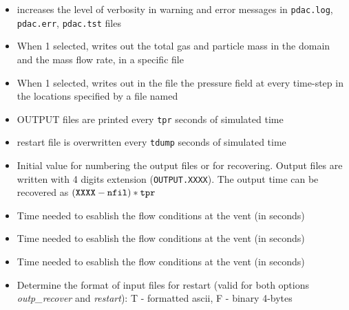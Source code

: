 \begin{itemize}
\item
{}
{increases the level of verbosity in warning and error messages 
in {\tt pdac.log}, {\tt pdac.err}, {\tt pdac.tst} files}

\item
{}
{ When 1 selected, writes out the total gas and particle mass in the domain
and the mass flow rate, in a specific file }

\item
{}
{ When 1 selected, writes out in the file  the pressure field at every time-step
in the locations specified by a file named }

\item
{}
{OUTPUT files are printed every {\tt tpr} seconds of simulated time}

\item
{}
{restart file is overwritten every {\tt tdump} seconds of simulated time}

\item
{}
{Initial value for numbering the output files or for recovering.
Output files are written with 4 digits extension ({\tt OUTPUT.XXXX}). 
The output time can be recovered as $({\tt XXXX - nfil})* {\tt tpr}$ }

\item
{}
{Time needed to esablish the flow conditions at the vent (in seconds)}

\item
{}
{Time needed to esablish the flow conditions at the vent (in seconds)}

\item
{}
{Time needed to esablish the flow conditions at the vent (in seconds)}

\item
{}
{Determine the format of input files for restart (valid for both options
{\em outp\_recover} and {\em restart}): T - formatted ascii, 
F - binary 4-bytes }


\end{itemize}
